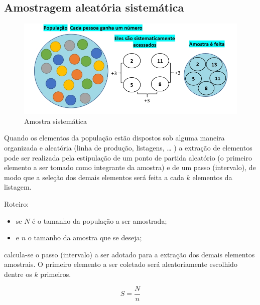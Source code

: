 \documentclass[
]{book}
\providecommand{\tightlist}{%
  \setlength{\itemsep}{0pt}\setlength{\parskip}{0pt}}
\begin{document}
\hypertarget{amostragem-aleatuxf3ria-sistemuxe1tica}{%
\subsection{Amostragem aleatória sistemática}\label{amostragem-aleatuxf3ria-sistemuxe1tica}}

\hfill\break

\begin{figure}

{\centering \includegraphics[width=0.8\linewidth]{images7/sistematica} 

}

\caption{Amostra sistemática}\label{fig:fig37}
\end{figure}

\hfill\break

Quando os elementos da população estão dispostos sob alguma maneira organizada e aleatória (linha de produção, listagens, \ldots{} ) a extração de elementos pode ser realizada pela estipulação de um ponto de partida aleatório (o primeiro elemento a ser tomado como integrante da amostra) e de um passo (intervalo), de modo que a seleção dos demais elementos será feita a cada \(k\) elementos da listagem.

\hfill\break

Roteiro:

\begin{itemize}
\tightlist
\item
  se \(N\) é o tamanho da população a ser amostrada;
\item
  e \(n\) o tamanho da amostra que se deseja;
\end{itemize}

calcula-se o passo (intervalo) a ser adotado para a extração dos demais elementos amostrais. O primeiro elemento a ser coletado será aleatoriamente escolhido dentre os \(k\) primeiros.

\hfill\break

\[
S=\frac{N}{n}
\]

\hfill\break
\end{document}
